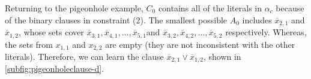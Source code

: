 Returning to the pigeonhole example, 
$C_0$ contains all of the literals in $\alpha_c$ because of the binary clauses in constraint (2). 
The smallest possible $A_0$ includes $\overline{x}_{2, 1}$ and $\overline{x}_{1, 2}$, whose 
sets cover $\overline{x}_{3, 1}, \overline{x}_{4, 1},  \ldots, \overline{x}_{5,
1}$and  $\overline{x}_{3, 2}, \overline{x}_{4, 2},  \ldots, \overline{x}_{5,
2}$ respectively. 
Whereas, the sets from $x_{1, 1}$ and $x_{2, 2}$ are empty (they are not inconsistent with the other literals).
Therefore, we can learn the clause $\overline{x}_{2, 1} \lor \overline{x}_{1, 2}$, shown in 
\autoref{subfig:pigeonholeclause-d}.





